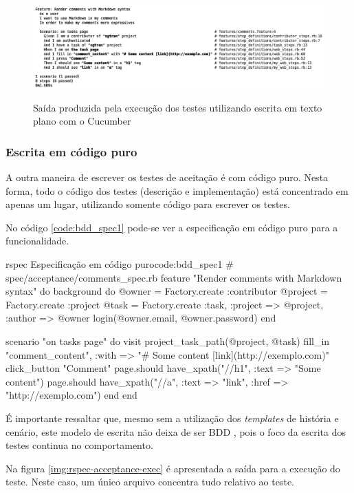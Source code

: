 \begin{figure}[h]
  \center
  \caption{Saída produzida pela execução dos testes utilizando escrita em texto plano com o Cucumber}
  \includegraphics[scale=0.41]{images/cucumber-exec}
  \label{img:cucumber-exec}
\end{figure}


\subsubsection{Escrita em código puro}
\label{ssub:Escrita em codigo puro}

A outra maneira de escrever os testes de aceitação é com código puro. Nesta forma, todo o código dos testes (descrição e implementação) está concentrado em apenas um lugar, utilizando somente código para escrever os testes.

No código \ref{code:bdd_spec1} pode-se ver a especificação em código puro para a funcionalidade.

\begin{mycode}{rspec}%
{Especificação em código puro}{code:bdd_spec1}
# spec/acceptance/comments_spec.rb
feature "Render comments with Markdown syntax" do
  background do
    @owner = Factory.create :contributor
    @project = Factory.create :project
    @task = Factory.create :task, :project => @project, :author => @owner
    login(@owner.email, @owner.password)
  end

  scenario "on tasks page" do
    visit project_task_path(@project, @task)
    fill_in "comment_content", :with => "# Some content [link](http://exemplo.com)"
    click_button "Comment"
    page.should have_xpath("//h1", :text => "Some content")
    page.should have_xpath("//a", :text => "link", :href => "http://exemplo.com")
  end
end
\end{mycode}

É importante ressaltar que, mesmo sem a utilização dos \textit{templates} de história e cenário, este modelo de escrita não deixa de ser BDD \cite{BDDSolis}, pois o foco da escrita dos testes continua no comportamento.

Na figura \ref{img:rspec-acceptance-exec} é apresentada a saída para a execução do teste. Neste caso, um único arquivo concentra tudo relativo ao teste.

